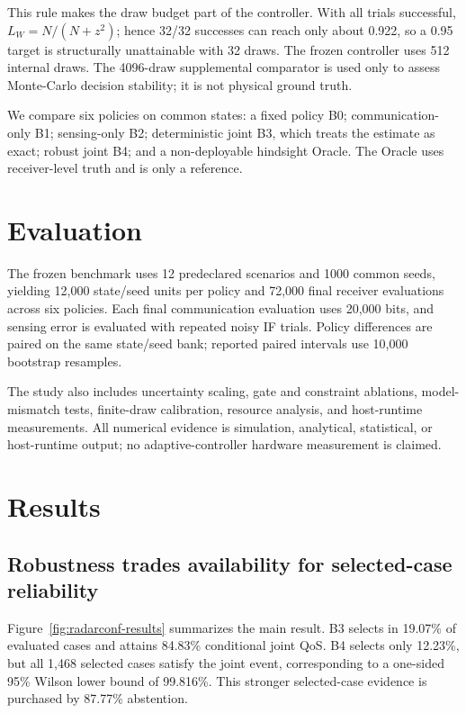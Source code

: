 \documentclass[conference,a4paper]{IEEEtran}
\begin{document}
This rule makes the draw budget part of the controller. With all trials successful, $L_W=N/(N+z^2)$; hence 32/32 successes can reach only about 0.922, so a 0.95 target is structurally unattainable with 32 draws. The frozen controller uses 512 internal draws. The 4096-draw supplemental comparator is used only to assess Monte-Carlo decision stability; it is not physical ground truth.

We compare six policies on common states: a fixed policy B0; communication-only B1; sensing-only B2; deterministic joint B3, which treats the estimate as exact; robust joint B4; and a non-deployable hindsight Oracle. The Oracle uses receiver-level truth and is only a reference.

\section{Evaluation}

The frozen benchmark uses 12 predeclared scenarios and 1000 common seeds, yielding 12,000 state/seed units per policy and 72,000 final receiver evaluations across six policies. Each final communication evaluation uses 20,000 bits, and sensing error is evaluated with repeated noisy IF trials. Policy differences are paired on the same state/seed bank; reported paired intervals use 10,000 bootstrap resamples.

The study also includes uncertainty scaling, gate and constraint ablations, model-mismatch tests, finite-draw calibration, resource analysis, and host-runtime measurements. All numerical evidence is simulation, analytical, statistical, or host-runtime output; no adaptive-controller hardware measurement is claimed.

\radarconfMainResults

\section{Results}

\subsection{Robustness trades availability for selected-case reliability}

Figure~\ref{fig:radarconf-results} summarizes the main result. B3 selects in 19.07\% of evaluated cases and attains 84.83\% conditional joint QoS. B4 selects only 12.23\%, but all 1,468 selected cases satisfy the joint event, corresponding to a one-sided 95\% Wilson lower bound of 99.816\%. This stronger selected-case evidence is purchased by 87.77\% abstention.
\end{document}
